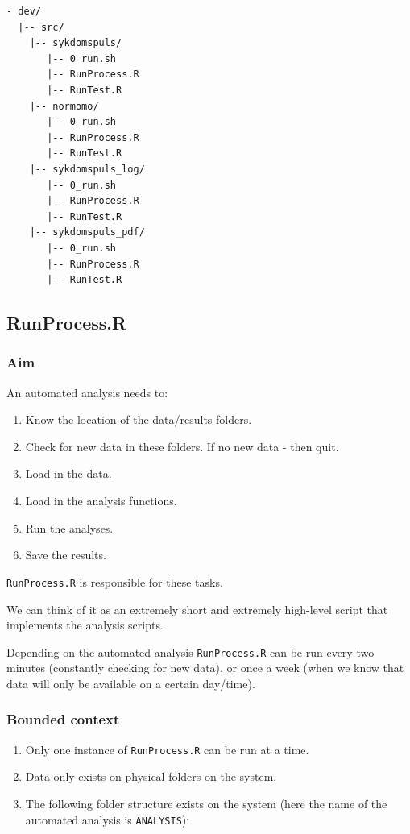\documentclass[12pt,]{article}
\providecommand{\tightlist}{%
  \setlength{\itemsep}{0pt}\setlength{\parskip}{0pt}}
\begin{document}
\begin{verbatim}
- dev/
  |-- src/
    |-- sykdomspuls/
       |-- 0_run.sh
       |-- RunProcess.R
       |-- RunTest.R
    |-- normomo/
       |-- 0_run.sh
       |-- RunProcess.R
       |-- RunTest.R
    |-- sykdomspuls_log/
       |-- 0_run.sh
       |-- RunProcess.R
       |-- RunTest.R
    |-- sykdomspuls_pdf/
       |-- 0_run.sh
       |-- RunProcess.R
       |-- RunTest.R
\end{verbatim}

\subsection{RunProcess.R}\label{runprocess.r}

\subsubsection{Aim}\label{aim}

An automated analysis needs to:

\begin{enumerate}
\def\labelenumi{\arabic{enumi}.}
\tightlist
\item
  Know the location of the data/results folders.
\item
  Check for new data in these folders. If no new data - then quit.
\item
  Load in the data.
\item
  Load in the analysis functions.
\item
  Run the analyses.
\item
  Save the results.
\end{enumerate}

\texttt{RunProcess.R} is responsible for these tasks.

We can think of it as an extremely short and extremely high-level script
that implements the analysis scripts.

Depending on the automated analysis \texttt{RunProcess.R} can be run
every two minutes (constantly checking for new data), or once a week
(when we know that data will only be available on a certain day/time).

\subsubsection{Bounded context}\label{bounded-context}

\begin{enumerate}
\def\labelenumi{\arabic{enumi}.}
\tightlist
\item
  Only one instance of \texttt{RunProcess.R} can be run at a time.
\item
  Data only exists on physical folders on the system.
\item
  The following folder structure exists on the system (here the name of
  the automated analysis is \texttt{ANALYSIS}):
\end{enumerate}
\end{document}
